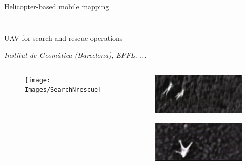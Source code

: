 \documentclass[envcountsect,usenames,dvipsnames]{beamer}
\theoremstyle{mystyle}
\begin{document}
\begin{frame}{Helicopter-based mobile mapping}
\begin{columns}
\begin{column}{0.35\textwidth}
\begin{figure}
			\end{figure}
		\end{column}
		\end{columns}
\end{frame}


\begin{frame}{UAV for search and rescue operations}
	
	\vspace{-0.7cm}
	
	\begin{center}
		\footnotesize{\textit{Institut de Geom\`{a}tica (Barcelona), EPFL, ...}}
	\end{center}
	
	\vspace{-0.2cm}
	 
	\begin{columns}
	\begin{column}{0.45\textwidth}
		\vspace{-0.5cm}
		\begin{figure}
		    \centering
		  \texttt{[image: Images/SearchNrescue]}
		\end{figure}
	\end{column}
	\begin{column}{0.55\textwidth}
		
	\begin{figure}
		\centering
		\includegraphics[width = 6cm]{Images/thermo1}
	\end{figure}
	\vspace{-0.6cm}
	\begin{figure}
	 	\centering
		\includegraphics[width = 6cm]{Images/thermo2}
	\end{figure}
	\end{column}
	\end{columns}
\end{frame}
\end{document}
